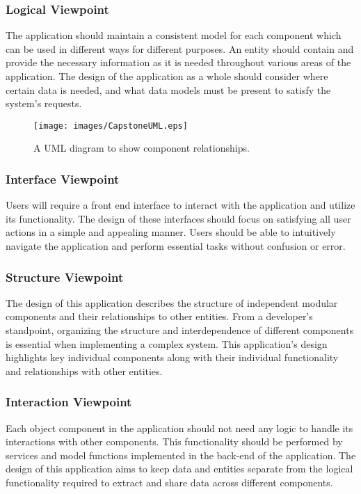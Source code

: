 \documentclass[journal,10pt,onecolumn,compsoc]{IEEEtran}
\begin{document}
    \subsubsection{Logical Viewpoint}  
    The application should maintain a consistent model for each component which can be used in different ways for different purposes. An entity should contain and provide the necessary information as it is needed throughout various areas of the application. The design of the application as a whole should consider where certain data is needed, and what data models must be present to satisfy the system's requests.
    \begin{figure}[H]
        \centering
        \texttt{[image: images/CapstoneUML.eps]}
        \caption{A UML diagram to show component relationships.}
    \end{figure}
    \subsubsection{Interface Viewpoint}  
    Users will require a front end interface to interact with the application and utilize its functionality. The design of these interfaces should focus on satisfying all user actions in a simple and appealing manner. Users should be able to intuitively navigate the application and perform essential tasks without confusion or error.
    \subsubsection{Structure Viewpoint} 
    The design of this application describes the structure of independent modular components and their relationships to other entities. From a developer's standpoint, organizing the structure and interdependence of different components is essential when implementing a complex system. This application's design highlights key individual components along with their individual functionality and relationships with other entities. 
    \subsubsection{Interaction Viewpoint}  
    Each object component in the application should not need any logic to handle its interactions with other components. This functionality should be performed by services and model functions implemented in the back-end of the application. The design of this application aims to keep data and entities separate from the logical functionality required to extract and share data across different components.
\end{document}

